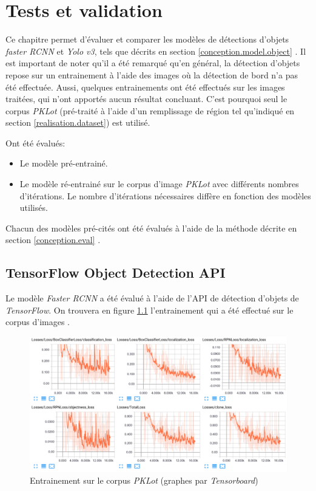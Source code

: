 \chapter{Tests et validation}
Ce chapitre permet d'évaluer et comparer les modèles de détections d'objets \textit{faster RCNN} et \textit{Yolo v3}, tels que décrits en section \ref{conception.model.object} . Il est important de noter qu'il a été remarqué qu'en général, la détection d'objets repose sur un entrainement à l'aide des images où la détection de bord n'a pas été effectuée. Aussi, quelques entrainements ont été effectués sur les images traitées, qui n'ont apportés aucun résultat concluant. C'est pourquoi seul le corpus \textit{PKLot} (pré-traité à l'aide d'un remplissage de région tel qu'indiqué en section \ref{realisation.dataset}) est utilisé.

Ont été évalués:
\begin{itemize}
    \item Le modèle pré-entrainé.
    \item Le modèle ré-entrainé sur le corpus d'image \textit{PKLot} avec différents nombres d'itérations. Le nombre d'itérations nécessaires diffère en fonction des modèles utilisés.
\end{itemize}

Chacun des modèles pré-cités ont été évalués à l'aide de la méthode décrite en section \ref{conception.eval} . 

\section{TensorFlow Object Detection API}
Le modèle \textit{Faster RCNN} a été évalué à l'aide de l'API de détection d'objets de \textit{TensorFlow}. On trouvera en figure \ref{fig:tensorflow_train} l'entrainement qui a été effectué sur le corpus d'images .

\begin{figure}[H]
    \includegraphics[width=15cm]{img/tests/tensorflow_pklot_full_train.png}
    \centering
    \caption{Entrainement sur le corpus \textit{PKLot} (graphes par \textit{Tensorboard})}
    \label{fig:tensorflow_train}
\end{figure} 

